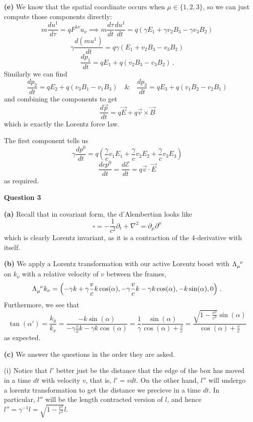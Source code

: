 \documentclass[10pt]{article}
\newcommand{\del}[2][]{\frac{d #1}{d #2}}
\begin{document}
\textbf{(e)} We know that the spatial coordinate occurs when $\mu \in \{1,2,3\}$, so we can just compute those components directly:
\[ m\del[u^{1}]{\tau} = qF^{1\nu}u_{\nu} \implies m\del[\tau]{t}\del[u^{1}]{t} = q\left(\gamma E_{1} + \gamma v_{2}B_{3} - \gamma v_{3} B_{2}\right) \]
\[ \gamma\del[(mu^{1})]{t} = q\gamma\left(E_{1} + v_{2}B_{3} - v_{3}B_{2}\right) \]
\[ \del[p_{1}]{t} = qE_{1} + q(v_{2}B_{3} - v_{3}B_{2})\, .\]
Similarly we can find
\[ \del[p_{2}]{t} = qE_{2} + q(v_{3}B_{1} - v_{1}B_{3}) \quad \& \quad \del[p_{3}]{t} = qE_{3} + q(v_{1}B_{2} - v_{2}B_{1}) \]
and combining the components to get
\[ \del[\vec{p}]{t} = q\vec{E} + q\vec{v}\times \vec{B} \]
which is exactly the Lorentz force law.

The first component tells us
\[ \gamma \del[p^{0}]{t} = q\left(\frac{\gamma}{c}v_{1}E_{1} + \frac{\gamma}{c}v_{2}E_{2} + \frac{\gamma}{c}v_{3}E_{3}\right) \]
\[ \del[cp^{0}]{t} = \del[\mathcal{E}]{t} = q\vec{v}\cdot \vec{E} \]
as required.

\newpage
\textbf{Question 3}

\textbf{(a)} Recall that in covariant form, the d'Alembertian looks like
\[ \square = -\frac{1}{c^{2}}\partial_{t} + \nabla^{2} = \partial_{\mu}\partial^{\mu} \]
which is clearly Lorentz invariant, as it is a contraction of the 4-derivative with itself. 

\textbf{(b)} We apply a Lorentz transformation with our active Lorentz boost with $\tensor{\Lambda}{_{\mu}^{\nu}}$ on $k_{\nu}$ with a relative velocity of $v$ between the frames,
\[ \tensor{\Lambda}{_{\mu}^{\nu}}k_{\nu} = \left(-\gamma k + \gamma \frac{v}{c}k\cos(\alpha), -\gamma\frac{v}{c}k -\gamma k \cos(\alpha), -k\sin(\alpha), 0\right) \, .\]
Furthermore, we see that
\[ \tan(\alpha') = \frac{k_{y}}{k_{x}} = \frac{-k\sin(\alpha)}{-\gamma\frac{v}{x}k - \gamma k\cos(\alpha)} = \frac{1}{\gamma}\frac{\sin(\alpha)}{\cos(\alpha) + \frac{v}{c}} = \frac{\sqrt{1 - \frac{v^{2}}{c^{2}}}\sin(\alpha)}{\cos(\alpha) + \frac{v}{c}}\]
as expected.

\textbf{(c)} We answer the questions in the order they are asked.

(i) Notice that $l'$ better just be the distance that the edge of the box has moved in a time $dt$ with velocity $v$, that is, $l' = vdt$. On the other hand, $l''$ will undergo a lorentz transformation to get the distance we precieve in a time $dt$. In particular, $l''$ will be the length contracted version of $l$, and hence $l'' = \gamma^{-1} l = \sqrt{1 - \frac{v^{2}}{c^{2}}}l$.
\end{document}

